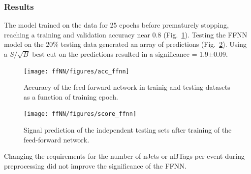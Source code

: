 \subsubsection{Results}
The model trained on the data for 25 epochs before prematurely stopping, reaching a training and validation accuracy near 0.8 (Fig.~\ref{fig:acc_nn}). Testing the FFNN model on the 20\% testing data generated an array of predictions (Fig.~\ref{fig:score_nn}). Using a $S/\sqrt{B}$ best cut on the predictions resulted in a significance = 1.9$\pm$0.09. 

\begin{figure}[!h] 
\begin{center}
\texttt{[image: ffNN/figures/acc\_ffnn]}
\caption{Accuracy of the feed-forward network in trainig and testing datasets as a function of training epoch.}
  \label{fig:acc_nn}
\end{center}
\end{figure}

\begin{figure}[!h] 
\begin{center}
\texttt{[image: ffNN/figures/score\_ffnn]}
\caption{Signal prediction of the independent testing sets after training of the feed-forward network.}
  \label{fig:score_nn}
\end{center}
\end{figure}

Changing the requirements for the number of nJets or nBTags per event during preprocessing did not improve the significance of the FFNN.

